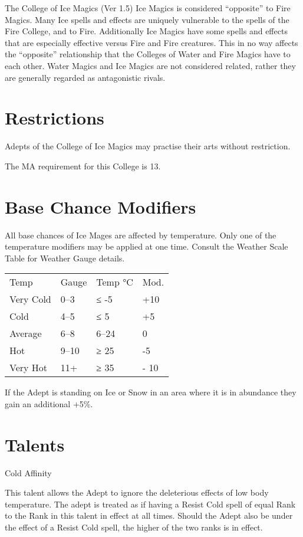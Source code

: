 \begin{Chapter}{The College of Ice Magics (Ver 1.5)}
Ice Magics is considered “opposite” to Fire Magics.  Many Ice spells
and effects are uniquely vulnerable to the spells of the Fire College,
and to Fire. Additionally Ice Magics have some spells and effects that
are especially effective versus Fire and Fire creatures.  This in no
way affects the “opposite” relationship that the Colleges of Water and
Fire Magics have to each other. Water Magics and Ice Magics are not
considered related, rather they are generally regarded as antagonistic
rivals.


\section{Restrictions}

Adepts  of  the  College  of  Ice  Magics  may  practise 
their arts without restriction. 

The MA requirement for this College is 13. 


\section{Base Chance Modifiers}

All base chances of Ice Mages are affected by temperature. Only one of
the temperature modifiers may be applied at one time.  Consult the
Weather Scale Table for Weather Gauge details.

\begin{tabularx}{\columnwidth}{XXXX} 
Temp		& Gauge		& Temp °C	& Mod. \\
Very Cold	& 0--3		& ≤ -5		& +10 \\
Cold 		& 4--5		& ≤ 5		& +5 \\
Average		& 6--8		& 6--24		& 0 \\
Hot		& 9--10		& ≥ 25		& -5 \\
Very Hot	& 11+		& ≥ 35		& - 10 \\
\end{tabularx}

If the Adept is standing on Ice or Snow in an area where it is in
abundance they gain an additional +5\%.


\section{Talents}

\begin{talent}[T-1]{Cold Affinity}

\begin{effects}
This talent allows the Adept to ignore the deleterious effects of low
body temperature.  The adept is treated as if having a Resist Cold
spell of equal Rank to the Rank in this talent in effect at all
times. Should the Adept also be under the effect of a Resist Cold
spell, the higher of the two ranks is in effect.
\end{effects}
\end{talent}


\end{Chapter}
